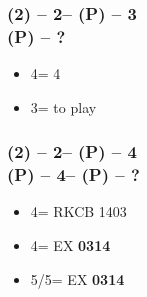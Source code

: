 \documentclass[12pt, a4paper]{article}
\begin{document}
\subsubsection*{(2\spades) -- 2\nt -- (P) -- 3\spades \\
                (P) -- ?}
\begin{itemize}
    \item 4\clubs = 4\hearts
    \item 3\nt = to play
\end{itemize}

\subsubsection*{(2\spades) -- 2\nt -- (P) -- 4\diams \\
                (P) -- 4\hearts -- (P) -- ?}
\begin{itemize}
    \item 4\spades = RKCB 1403
    \item 4\nt = EX \spades \textbf{0314}
    \item 5\clubs/5\diams = EX \textbf{0314}
\end{itemize}

\end{document}
